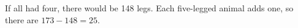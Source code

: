 If all had four, there would be 148 legs. Each five-legged animal adds one, so there are $173-148=\boxed{25}$.
